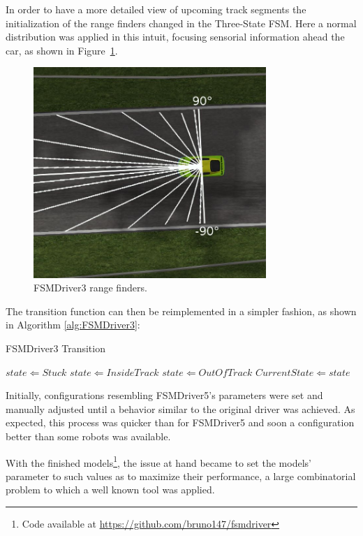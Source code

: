 In order to have a more detailed view of upcoming track segments the initialization of the range finders changed in the Three-State FSM. Here a normal distribution was applied in this intuit, focusing sensorial information ahead the car, as shown in Figure~\ref{Fig:FSM3Sensors}.
\begin{figure}[h]
	\centering
	\includegraphics[width=250pt]{FSM3Sensors}
	\caption{FSMDriver3 range finders.}
	\label{Fig:FSM3Sensors}
\end{figure}

The transition function can then be reimplemented in a simpler fashion, as shown in Algorithm \ref{alg:FSMDriver3}:

\begin{algorithm}[h]%
\caption{FSMDriver3 Transition}%
\label{alg:FSMDriver3}%
\begin{algorithmic}
        \STATE $state \Leftarrow Stuck$
    \ELSE
            \STATE $state \Leftarrow Inside Track$
        \ELSE
            \STATE $state \Leftarrow Out Of Track$
        \ENDIF
    \ENDIF
        \STATE $Current State \Leftarrow state$
    \ENDIF
\end{algorithmic}
\end{algorithm}

Initially, configurations resembling FSMDriver5's parameters were set and manually adjusted until a behavior similar to the original driver was achieved. As expected, this process was quicker than for FSMDriver5 and soon a configuration better than some robots was available.

With the finished models\footnote{Code available at \url{https://github.com/bruno147/fsmdriver}}, the issue at hand became to set the models' parameter to such values as to maximize their performance, a large combinatorial problem to which a well known tool was applied.

